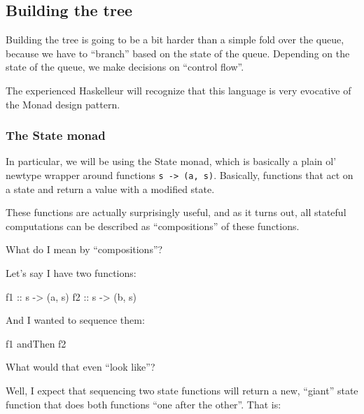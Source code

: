 \documentclass[]{article}
\newenvironment{Shaded}{}{}
\newcommand{\NormalTok}[1]{#1}
\newcommand{\OtherTok}[1]{\textcolor[rgb]{0.00,0.44,0.13}{#1}}
\begin{document}
\hypertarget{building-the-tree}{%
\subsection{Building the tree}\label{building-the-tree}}

Building the tree is going to be a bit harder than a simple fold over the queue,
because we have to ``branch'' based on the state of the queue. Depending on the
state of the queue, we make decisions on ``control flow''.

The experienced Haskelleur will recognize that this language is very evocative
of the Monad design pattern.

\hypertarget{the-state-monad}{%
\subsubsection{The State monad}\label{the-state-monad}}

In particular, we will be using the State monad, which is basically a plain ol'
newtype wrapper around functions \texttt{s\ -\textgreater{}\ (a,\ s)}.
Basically, functions that act on a state and return a value with a modified
state.

These functions are actually surprisingly useful, and as it turns out, all
stateful computations can be described as ``compositions'' of these functions.

What do I mean by ``compositions''?

Let's say I have two functions:

\begin{Shaded}
\begin{Highlighting}[]
\OtherTok{f1 ::}\NormalTok{ s }\OtherTok{{-}>}\NormalTok{ (a, s)}
\OtherTok{f2 ::}\NormalTok{ s }\OtherTok{{-}>}\NormalTok{ (b, s)}
\end{Highlighting}
\end{Shaded}

And I wanted to sequence them:

\begin{Shaded}
\begin{Highlighting}[]
\NormalTok{f1 }\OtherTok{\textasciigrave{}andThen\textasciigrave{}}\NormalTok{ f2}
\end{Highlighting}
\end{Shaded}

What would that even ``look like''?

Well, I expect that sequencing two state functions will return a new, ``giant''
state function that does both functions ``one after the other''. That is:
\end{document}
